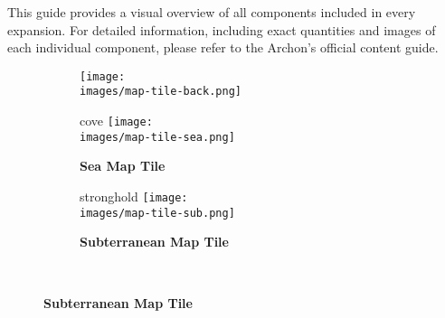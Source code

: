 
This guide provides a visual overview of all components included in every expansion. For detailed information, including exact quantities and images of each individual component, please refer to the Archon's official content guide.

\begin{figure}[H]
  \centering
  \hfill
  \begin{subfigure}[c]{0.25\linewidth}
    \centering
    \texttt{[image: \\images/map-tile-back.png]}
    \caption{\textbf{}}
  \end{subfigure}
  \hfill
  \begin{subfigure}[c]{0.17\linewidth}
    \begin{expansionmini}{cove}
      \centering
      \texttt{[image: \\images/map-tile-sea.png]}
      \caption{\textbf{Sea Map Tile}}
    \end{expansionmini}
  \end{subfigure}
  \hfill
  \begin{subfigure}[c]{0.17\linewidth}
    \begin{expansionmini}{stronghold}
      \centering
      \texttt{[image: \\images/map-tile-sub.png]}
      \caption{\textbf{Subterranean Map Tile}}
    \end{expansionmini}
  \end{subfigure}
  \hfill
  ~
\end{figure}

